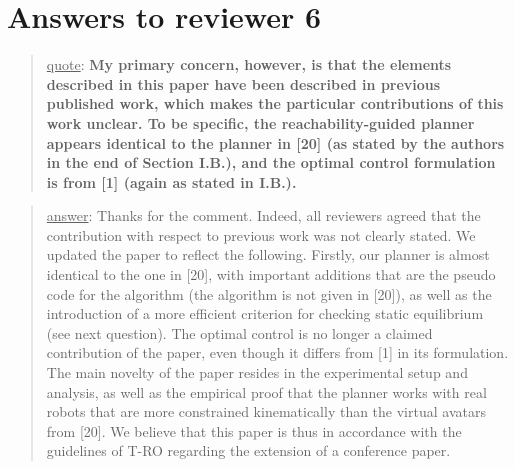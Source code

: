 \documentclass[a4paper]{article}
\newcommand\quot[1]{\begin{quote} \underline{quote}: \textbf{#1}\end{quote}}
\newcommand\as[1]{\begin{quote} \underline{answer}: {#1}\end{quote} }
\begin{document}
\section{Answers to reviewer 6}
\quot{ My primary concern, however,
is that the elements described in this paper have been described in
previous published work, which makes the particular contributions of
this work unclear. To be specific, the reachability-guided planner
appears identical to the planner in [20] (as stated by the authors in
the end of Section I.B.), and the optimal control formulation is from [1]
(again as stated in I.B.).}
\as{Thanks for the comment. Indeed, all reviewers agreed that the contribution with respect to previous work was not clearly stated. We updated the paper to reflect the following. Firstly, our planner is almost identical to the one in [20], with important additions that are the pseudo code for the algorithm (the algorithm is not given in [20]), as well as the introduction of a more efficient criterion
for checking static equilibrium (see next question). The optimal control is no longer a claimed contribution of the paper, even though it differs from [1] in its formulation. The main
novelty of the paper resides in the experimental setup and analysis, as well as the empirical proof that the planner works with real robots that are more constrained kinematically than the virtual avatars from [20]. We believe that this paper is thus in accordance with the guidelines of T-RO regarding the extension of a conference paper.}
\end{document}
